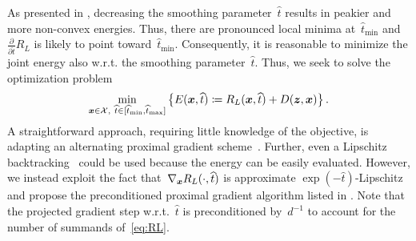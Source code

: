 \documentclass{article}
\newcommand{\X}{\mathcal{X}}
\def\hatt{{\widehat{t}}}
\newcommand{\tminh}{\hatt_\mathrm{min}}
\newcommand{\tmaxh}{\hatt_\mathrm{max}}
\theoremstyle{plain}
\theoremstyle{definition}
\theoremstyle{remark}
\begin{document}
As presented in , decreasing the smoothing parameter~$\hatt$ results in peakier and more non-convex energies.
Thus, there are pronounced local minima at~$\tminh$ and $\frac{\partial}{\partial\hatt}R_L$ is likely to point toward~$\tminh$.
Consequently, it is reasonable to minimize the joint energy also w.r.t. the smoothing parameter~$\hatt$.
Thus, we seek to solve the optimization problem
\begin{align} \label{eq:jointEnergy}
\min_{\vx\in\X,\ \hatt\in[\tminh,\tmaxh]} \left\{E(\vx,\hatt)\coloneqq R_L(\vx,\hatt) + D(\vz,\vx)\right\}.
\end{align}
A straightforward approach, requiring little knowledge of the objective, is adapting an alternating proximal gradient scheme~\citep{BoSa14}.
Further, even a Lipschitz backtracking~\citep{BeTe09} could be used because the energy can be easily evaluated.
However, we instead exploit the fact that~$\nabla_\vx R_L(\cdot,\hatt)$ is approximate $\exp(-\hatt)$-Lipschitz and propose the preconditioned proximal gradient algorithm listed in .
Note that the projected gradient step w.r.t.~$\hatt$ is preconditioned by~$d^{-1}$ to account for the number of summands of~\eqref{eq:RL}.
\end{document}
